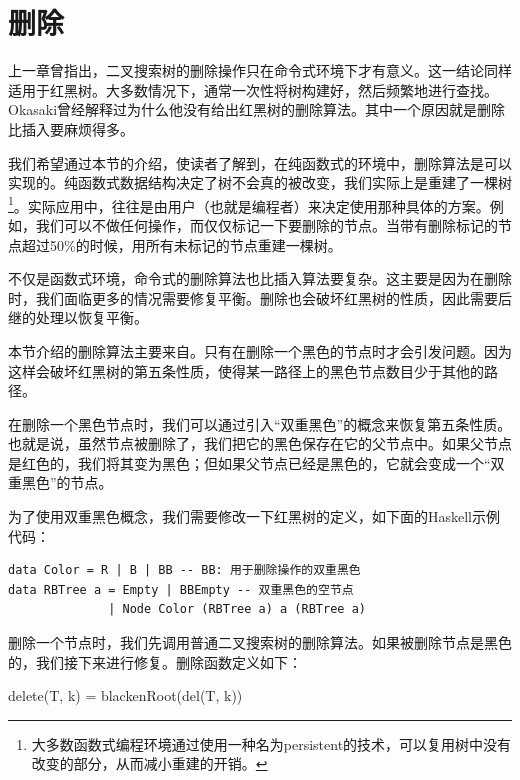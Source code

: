 \documentclass[b5paper]{ctexart}
\begin{document}

\section{删除}

上一章曾指出，二叉搜索树的删除操作只在命令式环境下才有意义。这一结论同样适用于红黑树。大多数情况下，通常一次性将树构建好，然后频繁地进行查找。Okasaki曾经解释过为什么他没有给出红黑树的删除算法\cite{okasaki-blog}。其中一个原因就是删除比插入要麻烦得多。

我们希望通过本节的介绍，使读者了解到，在纯函数式的环境中，删除算法是可以实现的。纯函数式数据结构决定了树不会真的被改变，我们实际上是重建了一棵树\footnote{大多数函数式编程环境通过使用一种名为persistent的技术，可以复用树中没有改变的部分，从而减小重建的开销。}。实际应用中，往往是由用户（也就是编程者）来决定使用那种具体的方案。例如，我们可以不做任何操作，而仅仅标记一下要删除的节点。当带有删除标记的节点超过50\%的时候，用所有未标记的节点重建一棵树。

不仅是函数式环境，命令式的删除算法也比插入算法要复杂。这主要是因为在删除时，我们面临更多的情况需要修复平衡。删除也会破坏红黑树的性质，因此需要后继的处理以恢复平衡。

本节介绍的删除算法主要来自\cite{lyn}。只有在删除一个黑色的节点时才会引发问题。因为这样会破坏红黑树的第五条性质，使得某一路径上的黑色节点数目少于其他的路径。

在删除一个黑色节点时，我们可以通过引入“双重黑色”\cite{CLRS}的概念来恢复第五条性质。也就是说，虽然节点被删除了，我们把它的黑色保存在它的父节点中。如果父节点是红色的，我们将其变为黑色；但如果父节点已经是黑色的，它就会变成一个“双重黑色”的节点。

为了使用双重黑色概念，我们需要修改一下红黑树的定义，如下面的Haskell示例代码：

\lstset{language=Haskell}
\begin{lstlisting}[style=Haskell]
data Color = R | B | BB -- BB: 用于删除操作的双重黑色
data RBTree a = Empty | BBEmpty -- 双重黑色的空节点
              | Node Color (RBTree a) a (RBTree a)
\end{lstlisting}

删除一个节点时，我们先调用普通二叉搜索树的删除算法。如果被删除节点是黑色的，我们接下来进行修复。删除函数定义如下：

\be
delete(T, k) = blackenRoot(del(T, k))
\ee
\end{document}
